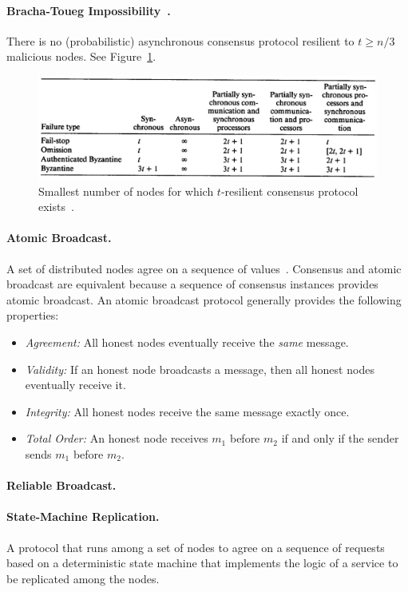 \documentclass[11pt]{article}
\theoremstyle{mytheoremstyle}
\begin{document}
\paragraph{Bracha-Toueg Impossibility~\cite{Bracha:Toueg:1983}.} There is no (probabilistic) asynchronous consensus protocol resilient to $t \geq n/3$ malicious nodes. See Figure~\ref{fig:bounds}.

\begin{figure}
	\centering
	\includegraphics[width=0.9\linewidth]{bounds}
	\caption{Smallest number of nodes for which $t$-resilient consensus protocol exists~\cite{dwork:1988:cpp}.}
	\label{fig:bounds}
\end{figure}

\paragraph{Atomic Broadcast.}
A set of distributed nodes agree on a sequence of values~\cite{AtomicBroadcast:1993}. Consensus and atomic broadcast are equivalent because a sequence of consensus instances provides atomic broadcast. An atomic broadcast protocol generally provides the following properties:
\begin{itemize}
	\item \textit{Agreement:} All honest nodes eventually receive the \emph{same} message.
	\item \textit{Validity:} If an honest node broadcasts a message, then all honest nodes eventually receive it.
	\item \textit{Integrity:} All honest nodes receive the same message exactly once.
	\item \textit{Total Order:} An honest node receives $m_1$ before $m_2$ if and only if the sender sends $m_1$ before $m_2$.
\end{itemize}

\paragraph{Reliable Broadcast.}

\paragraph{State-Machine Replication.}
A protocol that runs among a set of nodes to agree on a sequence of requests based on a deterministic state machine that implements the logic of a service to be replicated among the nodes.
\end{document}
